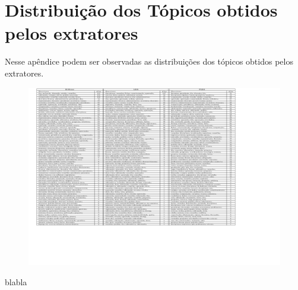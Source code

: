 \chapter{ Distribuição dos Tópicos obtidos pelos extratores}\label{apendice3}




Nesse apêndice podem ser observadas as distribuições dos tópicos obtidos pelos extratores.



\begin{landscape}%







\begin{figure}[h]
\center
	\includegraphics[trim={ 40 600 200 0 }, page=1,width=1.2\textwidth]{anexos/tabelas/distribuicao-topicos/distribuicao-topicos.pdf}
\end{figure}





\begin{table}[b]
	\caption{blabla}
\end{table}




\end{landscape}

